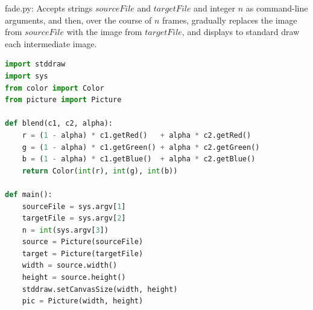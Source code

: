 \documentclass[8pt,a4paper,compress,handout]{beamer}
\begin{document}
\begin{frame}[fragile]
\begin{framed}
\tiny fade.py: Accepts strings $sourceFile$ and $targetFile$ and integer $n$ as command-line arguments, and then, over the course of $n$ frames, gradually replaces the image from $sourceFile$ with the image from $targetFile$, and displays to standard draw each intermediate image. 
\end{framed}

\begin{lstlisting}[language=Python]
import stddraw
import sys
from color import Color
from picture import Picture

def blend(c1, c2, alpha):
    r = (1 - alpha) * c1.getRed()   + alpha * c2.getRed()
    g = (1 - alpha) * c1.getGreen() + alpha * c2.getGreen()
    b = (1 - alpha) * c1.getBlue()  + alpha * c2.getBlue()
    return Color(int(r), int(g), int(b))

def main():
    sourceFile = sys.argv[1]
    targetFile = sys.argv[2]
    n = int(sys.argv[3])
    source = Picture(sourceFile)
    target = Picture(targetFile)
    width = source.width()
    height = source.height()
    stddraw.setCanvasSize(width, height)
    pic = Picture(width, height)
\end{lstlisting}
\end{frame}
\end{document}
